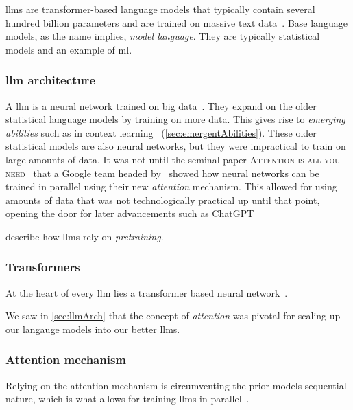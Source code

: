 \acrfull{llms} are transformer-based language models that typically contain several hundred billion
parameters and are trained on massive text data~\cite[4]{llmSurvey}.
Base language models, as the name implies, \textit{model language}. They are typically statistical
models and an example of \acrfull{ml}.

\subsubsection*{\acrfull{llm} architecture}\label{sec:llmArch}

A \acrlong{llm} is a neural network trained on big
data~\cite[3]{llmSurvey}. They expand on the older statistical language models by
training on more data. This gives rise to \textit{emerging abilities} such as in
context learning~\cite[3]{llmSurvey} (\cref{sec:emergentAbilities}). These older statistical models are also
neural networks, but they were impractical to train on large amounts of data. It
was not until the seminal paper \textsc{Attention is all you
    need}~\cite{attentionIsAllYouNeed} that a Google team headed by~\citeauthor{attentionIsAllYouNeed} showed how neural networks
can be trained in parallel using their new \textit{attention} mechanism. This
allowed for using amounts of data that was not technologically practical up
until that point, opening the door for later advancements such as
ChatGPT~\cite[9]{llmSurvey}

\citeauthor{jm} describe how \acrshort{llms} rely on \textit{pretraining}.

\subsubsection*{Transformers}

At the heart of every \acrshort{llm} lies a transformer based neural
network~\cite[4]{llmSurvey}.

We saw in \cref{sec:llmArch} that the \citeauthor{attentionIsAllYouNeed} concept
of \textit{attention} was pivotal for scaling up our langauge models into our
better \acrlong{llms}.

\subsubsection*{Attention mechanism}

Relying on the attention mechanism is circumventing the
prior models sequential nature, which is what allows for training \acrlong{llms}
in parallel~\cite[2]{attentionIsAllYouNeed}.

